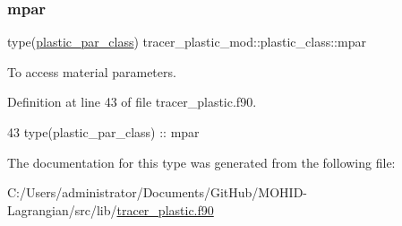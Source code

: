 \subsubsection{\texorpdfstring{mpar}{mpar}}
{\footnotesize\ttfamily type(\mbox{\hyperlink{structtracer__plastic__mod_1_1plastic__par__class}{plastic\+\_\+par\+\_\+class}}) tracer\+\_\+plastic\+\_\+mod\+::plastic\+\_\+class\+::mpar\hspace{0.3cm}{\ttfamily [private]}}



To access material parameters. 



Definition at line 43 of file tracer\+\_\+plastic.\+f90.


\begin{DoxyCode}
43         \textcolor{keywordtype}{type}(plastic\_par\_class)   :: mpar
\end{DoxyCode}


The documentation for this type was generated from the following file\+:\begin{DoxyCompactItemize}
\item 
C\+:/\+Users/administrator/\+Documents/\+Git\+Hub/\+M\+O\+H\+I\+D-\/\+Lagrangian/src/lib/\mbox{\hyperlink{tracer__plastic_8f90}{tracer\+\_\+plastic.\+f90}}\end{DoxyCompactItemize}
